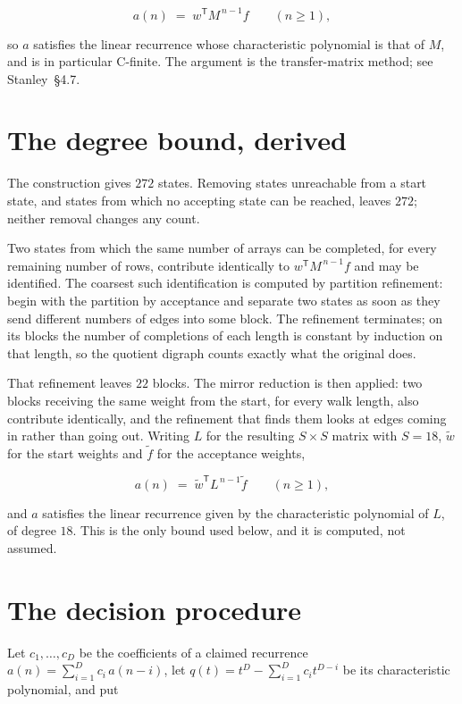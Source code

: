 \documentclass[11pt]{article}
\theoremstyle{definition}
\begin{document}
\[a(n) \;=\; w^{\mathsf T} M^{\,n-1} f \qquad (n \ge 1),\]

so $a$ satisfies the linear recurrence whose characteristic polynomial is that of $M$, and is in particular C-finite. The argument is the transfer-matrix method; see Stanley~\S4.7.

\section{The degree bound, derived}

The construction gives $272$ states. Removing states unreachable from a start state, and states from which no accepting state can be reached, leaves $272$; neither removal changes any count.

Two states from which the same number of arrays can be completed, for every remaining number of rows, contribute identically to $w^{\mathsf T}M^{\,n-1}f$ and may be identified. The coarsest such identification is computed by partition refinement: begin with the partition by acceptance and separate two states as soon as they send different numbers of edges into some block. The refinement terminates; on its blocks the number of completions of each length is constant by induction on that length, so the quotient digraph counts exactly what the original does.

That refinement leaves $22$ blocks. The mirror reduction is then applied: two blocks receiving the same weight from the start, for every walk length, also contribute identically, and the refinement that finds them looks at edges coming in rather than going out. Writing $L$ for the resulting $S \times S$ matrix with $S = 18$, $\tilde w$ for the start weights and $\tilde f$ for the acceptance weights,

\[a(n) \;=\; \tilde w^{\mathsf T} L^{\,n-1} \tilde f \qquad (n \ge 1),\]

and $a$ satisfies the linear recurrence given by the characteristic polynomial of $L$, of degree $18$. This is the only bound used below, and it is computed, not assumed.

\section{The decision procedure}

Let $c_1,\dots,c_D$ be the coefficients of a claimed recurrence $a(n) = \sum_{i=1}^{D} c_i\,a(n-i)$, let $q(t) = t^{D} - \sum_{i=1}^{D} c_i t^{D-i}$ be its characteristic polynomial, and put
\end{document}

